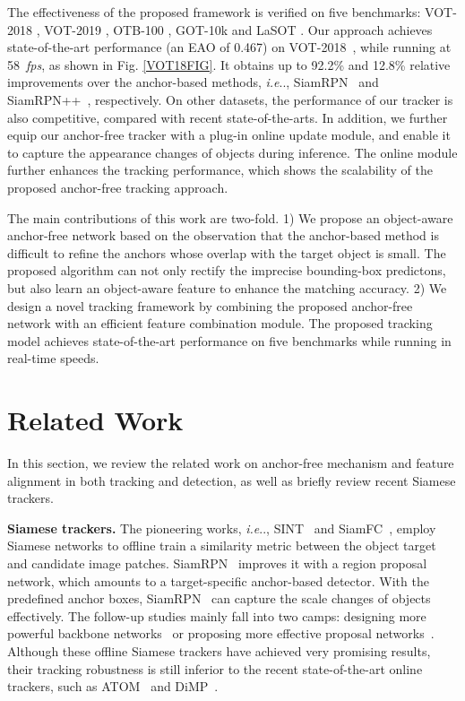 \documentclass[runningheads]{llncs}
\makeatletter
\DeclareRobustCommand\onedot{\futurelet\@let@token\@onedot}
\def\@onedot{\ifx\@let@token.\else.\null\fi\xspace}
\def\ie{\emph{i.e}\onedot} \def\Ie{\emph{I.e}\onedot}
\makeatother
\begin{document}
The effectiveness of the proposed framework is verified on five benchmarks: VOT-2018 \cite{VOT-2018}, VOT-2019 \cite{VOT2019}, OTB-100 \cite{OTB-2015}, GOT-10k \cite{GOT10K} and LaSOT \cite{LASOT}. Our approach achieves state-of-the-art performance (an EAO of 0.467) on VOT-2018~\cite{VOT-2018}, while running at 58~\emph{fps}, as shown in Fig. \ref{VOT18FIG}. It obtains up to 92.2\% and 12.8\% relative improvements over the anchor-based methods, \ie, SiamRPN~\cite{siamRPN} and SiamRPN++~\cite{SiamRPN++}, respectively. On other datasets, the performance of our tracker is also competitive, compared with recent state-of-the-arts. In addition, we further equip our anchor-free tracker with a plug-in online update module, and enable it to capture the appearance changes of objects during inference. The online module further enhances the tracking performance, which shows the scalability of the proposed anchor-free tracking approach.

The main contributions of this work are two-fold.  1) We propose an object-aware anchor-free network based on the observation that the anchor-based method is difficult to refine the anchors whose overlap with the target object is small. The proposed algorithm can not only rectify the imprecise bounding-box predictons, but also learn an object-aware feature to enhance the matching accuracy. 2) We design a novel tracking framework by combining the proposed anchor-free network with an efficient feature combination module. The proposed tracking model achieves state-of-the-art performance on five benchmarks while running in real-time speeds.






\vspace{-0.8em}
\section{Related Work} \label{Sec2}
\vspace{-0.5em}
In this section, we review the related work on anchor-free mechanism and feature alignment in both tracking and detection, as well as briefly review recent Siamese trackers.



\textbf{Siamese trackers.} The pioneering works, \ie, SINT~\cite{SINT} and SiamFC~\cite{siamFC}, employ Siamese networks to offline train a similarity metric between the object target and candidate image patches. SiamRPN~\cite{siamRPN} improves it with a region proposal network, which amounts to a target-specific anchor-based detector. With the predefined anchor boxes, SiamRPN~\cite{siamRPN} can capture the scale changes of objects effectively. The follow-up studies mainly fall into two camps: designing more powerful backbone networks~\cite{SiamRPN++,SiamDW} or proposing more effective proposal networks~\cite{CRPN}. Although these offline Siamese trackers have achieved very promising results, their tracking robustness is still inferior to the recent state-of-the-art online trackers, such as ATOM~\cite{ATOM} and DiMP~\cite{DiMP}.
\end{document}
